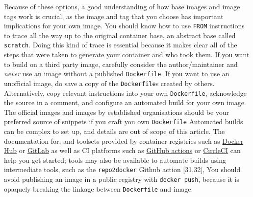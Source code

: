 \documentclass[10pt,letterpaper]{article}
\begin{document}
Because of these options, a good understanding of how base images and
image tags work is crucial, as the image and tag that you choose has
important implications for your own image. You should know how to use
\texttt{FROM} instructions to trace all the way up to the original
container base, an abstract base called \texttt{scratch}. Doing this
kind of trace is essential because it makes clear all of the steps that
were taken to generate your container and who took them. If you want to
build on a third party image, carefully consider the author/maintainer
and \emph{never} use an image without a published \texttt{Dockerfile}.
If you want to use an unofficial image, do save a copy of the
\texttt{Dockerfile}s created by others. Alternatively, copy relevant
instructions into your own \texttt{Dockerfile}, acknowledge the source
in a comment, and configure an automated build for your own image. The
official images and images by established organisations should be your
preferred source of snippets if you craft you own \texttt{Dockerfile}
Automated builds can be complex to set up, and details are out of scope
of this article. The documentation for, and toolsets provided by
container registries such as
\href{https://docs.docker.com/docker-hub/builds/}{Docker Hub} or
\href{https://docs.gitlab.com/ee/user/packages/container_registry/index.html\#build-and-push-images}{GitLab}
as well as CI platforms such as
\href{https://github.com/actions/starter-workflows/tree/master/ci}{GitHub
actions} or
\href{https://circleci.com/orbs/registry/orb/circleci/docker\#commands-build}{CircleCI}
can help you get started; tools may also be available to automate builds
using intermediate tools, such as the \texttt{repo2docker} Github action
{[}31,32{]}, You should avoid publishing an image in a public registry
with \texttt{docker\ push}, because it is opaquely breaking the linkage
between \texttt{Dockerfile} and image.
\end{document}
